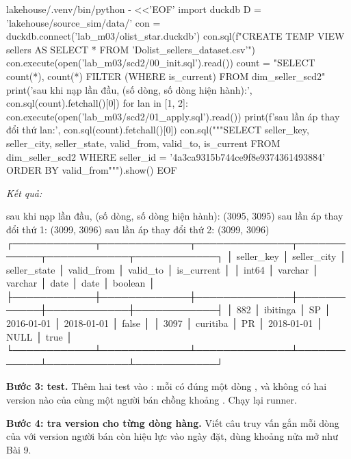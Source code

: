 \begin{codeblock}
lakehouse/.venv/bin/python - <<'EOF'
import duckdb
D = 'lakehouse/source_sim/data/'
con = duckdb.connect('lab_m03/olist_star.duckdb')
con.sql(f"CREATE TEMP VIEW sellers AS SELECT * FROM '{D}olist_sellers_dataset.csv'")
con.execute(open('lab_m03/scd2/00_init.sql').read())
count = "SELECT count(*), count(*) FILTER (WHERE is_current) FROM dim_seller_scd2"
print('sau khi nạp lần đầu, (số dòng, số dòng hiện hành):',
      con.sql(count).fetchall()[0])
for lan in [1, 2]:
    con.execute(open('lab_m03/scd2/01_apply.sql').read())
    print(f'sau lần áp thay đổi thứ {lan}:', con.sql(count).fetchall()[0])
con.sql("""SELECT seller_key, seller_city, seller_state,
                  valid_from, valid_to, is_current
           FROM dim_seller_scd2
           WHERE seller_id = '4a3ca9315b744ce9f8e9374361493884'
           ORDER BY valid_from""").show()
EOF
\end{codeblock}
\textit{Kết quả:}
\begin{codeblock}
sau khi nạp lần đầu, (số dòng, số dòng hiện hành): (3095, 3095)
sau lần áp thay đổi thứ 1: (3099, 3096)
sau lần áp thay đổi thứ 2: (3099, 3096)
┌────────────┬─────────────┬──────────────┬────────────┬────────────┬────────────┐
│ seller_key │ seller_city │ seller_state │ valid_from │  valid_to  │ is_current │
│   int64    │   varchar   │   varchar    │    date    │    date    │  boolean   │
├────────────┼─────────────┼──────────────┼────────────┼────────────┼────────────┤
│        882 │ ibitinga    │ SP           │ 2016-01-01 │ 2018-01-01 │ false      │
│       3097 │ curitiba    │ PR           │ 2018-01-01 │ NULL       │ true       │
└────────────┴─────────────┴──────────────┴────────────┴────────────┴────────────┘
\end{codeblock}

\textbf{Bước 3: test.} Thêm hai test vào : mỗi  có đúng một dòng , và không có hai version nào của cùng một người bán chồng khoảng \code{[valid\_\allowbreak{}from, valid\_\allowbreak{}to)}. Chạy lại runner.

\textbf{Bước 4: tra version cho từng dòng hàng.} Viết câu truy vấn gắn mỗi dòng của  với version người bán còn hiệu lực vào ngày đặt, dùng khoảng nửa mở như Bài 9.


